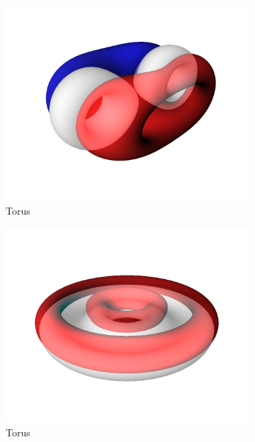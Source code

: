 \documentclass{l4proj}
\begin{document}
\begin{figure}[H]
  \begin{subfigure}[b]{0.24\textwidth}
    \includegraphics[width=\textwidth]{images/representations/onion-torus.png}
    \caption{Torus}
    \label{fig:rep_onion-torus1}
  \end{subfigure}
  \begin{subfigure}[b]{0.24\textwidth}
    \includegraphics[width=\textwidth]{images/representations/onion-torus-2.png}
    \caption{Torus}
    \label{fig:rep_onion-torus2}
  \end{subfigure}
  \begin{subfigure}[b]{0.24\textwidth}

\end{subfigure}
\end{figure}
\end{document}
